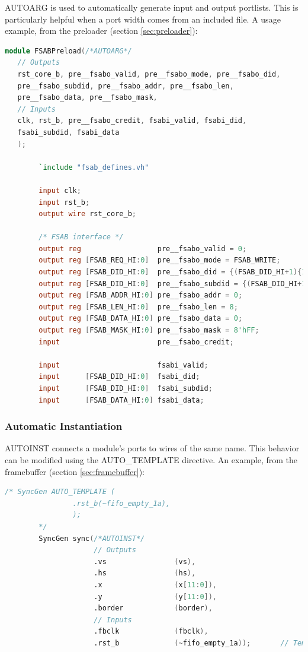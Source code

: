 \documentclass[10pt]{report}
\begin{document}
AUTOARG is used to automatically generate input and output portlists. This
is particularly helpful when a port width comes from an included file. A
usage example, from the preloader (section \ref{sec:preloader}):


\begin{lstlisting}[basicstyle=\footnotesize,language=Verilog]
module FSABPreload(/*AUTOARG*/
   // Outputs
   rst_core_b, pre__fsabo_valid, pre__fsabo_mode, pre__fsabo_did,
   pre__fsabo_subdid, pre__fsabo_addr, pre__fsabo_len,
   pre__fsabo_data, pre__fsabo_mask,
   // Inputs
   clk, rst_b, pre__fsabo_credit, fsabi_valid, fsabi_did,
   fsabi_subdid, fsabi_data
   );
 
        `include "fsab_defines.vh"
 
        input clk;
        input rst_b;
        output wire rst_core_b;
 
        /* FSAB interface */
        output reg                  pre__fsabo_valid = 0;
        output reg [FSAB_REQ_HI:0]  pre__fsabo_mode = FSAB_WRITE;
        output reg [FSAB_DID_HI:0]  pre__fsabo_did = {(FSAB_DID_HI+1){1'b1}};
        output reg [FSAB_DID_HI:0]  pre__fsabo_subdid = {(FSAB_DID_HI+1){1'b0}};
        output reg [FSAB_ADDR_HI:0] pre__fsabo_addr = 0;
        output reg [FSAB_LEN_HI:0]  pre__fsabo_len = 8;
        output reg [FSAB_DATA_HI:0] pre__fsabo_data = 0;
        output reg [FSAB_MASK_HI:0] pre__fsabo_mask = 8'hFF;
        input                       pre__fsabo_credit;
 
        input                       fsabi_valid;
        input      [FSAB_DID_HI:0]  fsabi_did;
        input      [FSAB_DID_HI:0]  fsabi_subdid;
        input      [FSAB_DATA_HI:0] fsabi_data;
\end{lstlisting}

\subsubsection{Automatic Instantiation}

AUTOINST connects a module's ports to wires of the same name. This behavior
can be modified using the AUTO\_TEMPLATE directive. An example, from the
framebuffer (section \ref{sec:framebuffer}):

\begin{lstlisting}[basicstyle=\footnotesize,language=Verilog]
        /* SyncGen AUTO_TEMPLATE (
                .rst_b(~fifo_empty_1a),
                );
        */
        SyncGen sync(/*AUTOINST*/
                     // Outputs
                     .vs                (vs),
                     .hs                (hs),
                     .x                 (x[11:0]),
                     .y                 (y[11:0]),
                     .border            (border),
                     // Inputs
                     .fbclk             (fbclk),
                     .rst_b             (~fifo_empty_1a));       // Templated
\end{lstlisting}
\end{document}
